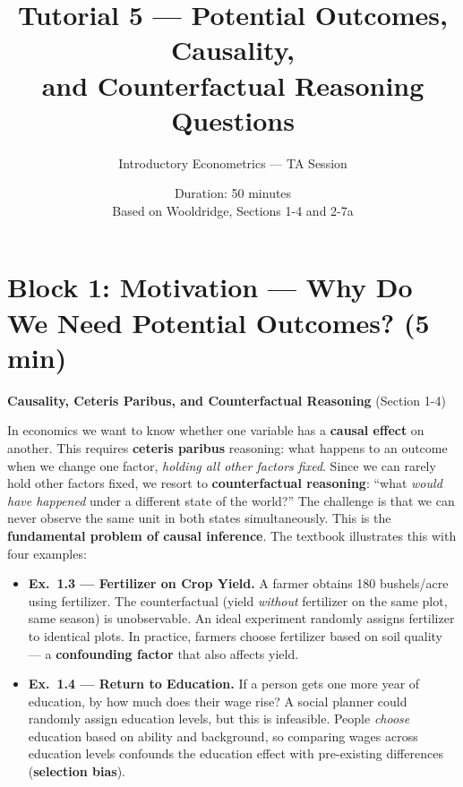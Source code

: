 \documentclass[11pt,a4paper]{article}
\title{\textbf{Tutorial 5 --- Potential Outcomes, Causality,\\ and Counterfactual Reasoning}\\\medskip \Large Questions}
\author{Introductory Econometrics --- TA Session}
\date{Duration: 50 minutes \\ \medskip \small Based on Wooldridge, Sections 1-4 and 2-7a}
\begin{document}
\maketitle
\thispagestyle{empty}

\section{Block 1: Motivation --- Why Do We Need Potential Outcomes? \textnormal{(5 min)}}

\begin{bookexample}
\textbf{\color{blockcolor}Causality, Ceteris Paribus, and Counterfactual Reasoning} {\small (Section 1-4)}

\smallskip
In economics we want to know whether one variable has a \textbf{causal effect} on another. This requires \textbf{ceteris paribus} reasoning: what happens to an outcome when we change one factor, \emph{holding all other factors fixed}. Since we can rarely hold other factors fixed, we resort to \textbf{counterfactual reasoning}: ``what \emph{would have happened} under a different state of the world?'' The challenge is that we can never observe the same unit in both states simultaneously. This is the \textbf{fundamental problem of causal inference}. The textbook illustrates this with four examples:

\smallskip
\begin{itemize}[leftmargin=1.5em,itemsep=3pt]
  \item \textbf{Ex.~1.3 --- Fertilizer on Crop Yield.} A farmer obtains 180 bushels/acre using fertilizer. The counterfactual (yield \emph{without} fertilizer on the same plot, same season) is unobservable. An ideal experiment randomly assigns fertilizer to identical plots. In practice, farmers choose fertilizer based on soil quality --- a \textbf{confounding factor} that also affects yield.

  \item \textbf{Ex.~1.4 --- Return to Education.} If a person gets one more year of education, by how much does their wage rise? A social planner could randomly assign education levels, but this is infeasible. People \emph{choose} education based on ability and background, so comparing wages across education levels confounds the education effect with pre-existing differences (\textbf{selection bias}).


\end{itemize}
\end{bookexample}
\end{document}
